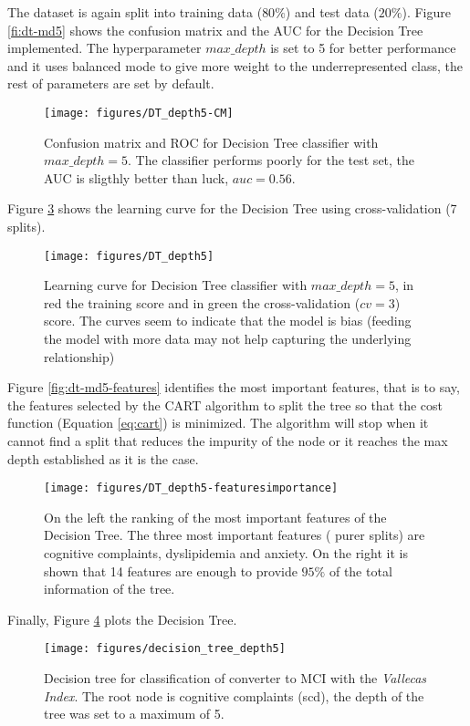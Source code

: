 \documentclass[11pt]{article}
\theoremstyle{definition}
\theoremstyle{remark}
\begin{document}
{The dataset is again split into training data ($80\%$) and test data ($20\%$). Figure \ref{fi:dt-md5} shows the confusion matrix and the AUC for the Decision Tree implemented. The hyperparameter $max\_depth$ is set to 5 for better performance and it uses balanced mode to give more weight to the underrepresented class, the rest of parameters are set by default.
\begin{figure}[H]
        \centering
        \texttt{[image: figures/DT\_depth5-CM]}
        \caption{Confusion matrix and ROC for Decision Tree classifier with $max\_depth=5$. The classifier performs poorly for the test set, the AUC is sligthly better than luck, $auc=0.56$.
        } \label{fig:dt-md5}
\end{figure}

Figure \ref{fig:dt-md5-learning} shows the learning curve for the Decision Tree using cross-validation (7 splits). 
\begin{figure}[H]
        \centering
        \texttt{[image: figures/DT\_depth5]}
        \caption{Learning curve for Decision Tree classifier with $max\_depth=5$, in red the training score and in green the cross-validation ($cv=3$) score. The curves seem to indicate that the model is bias (feeding the model with more data may not help capturing the underlying relationship)
        } \label{fig:dt-md5-learning}
\end{figure}

Figure \ref{fig:dt-md5-features} identifies the most important features, that is to say, the features selected by the CART algorithm to split the tree so that the cost function (Equation \ref{eq:cart}) is minimized. The algorithm will stop when it cannot find a split that reduces the impurity of the node or it reaches the max depth established as it is the case.
\begin{figure}[H]
        \centering
        \texttt{[image: figures/DT\_depth5-featuresimportance]}
        \caption{On the left the ranking of the most important features of the Decision Tree. The three most important features ( purer splits) are cognitive complaints, dyslipidemia and anxiety. On the right it is shown that 14 features are enough to provide $95\%$ of the total information of the tree.   
        } \label{fig:dt-md5-learning}
\end{figure}

Finally, Figure \ref{fig:dt-md5-dot} plots the Decision Tree. 
\begin{figure}[H]
        \centering
        \texttt{[image: figures/decision\_tree\_depth5]}
        \caption{Decision tree for classification of converter to MCI with the \emph{Vallecas Index}. The root node is cognitive complaints (scd), the depth of the tree was set to a maximum of 5.
        } \label{fig:dt-md5-dot}
\end{figure}


}
\end{document}
